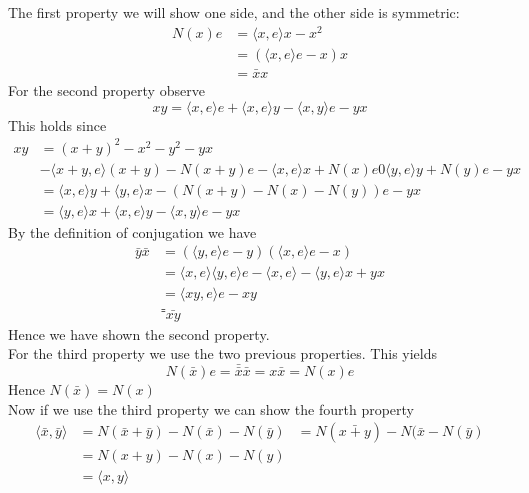 \documentclass[../Thesis.tex]{subfiles}
\begin{document}
\begin{myproof}
The first property we will show one side, and the other side is symmetric:
\begin{align*}
N(x)e &= \langle x,e \rangle x - x^2\\
      &= ( \langle x, e \rangle e - x) x\\
      &= \bar{x}x
\end{align*}
For the second property observe
\begin{equation}
xy = \langle x,e \rangle e + \langle x, e \rangle y - \langle x, y \rangle e - yx
\end{equation}
This holds since
\begin{align*}
xy &= (x + y)^2 - x^2 - y^2 - yx\\
   &- \langle x + y, e \rangle ( x + y) - N(x + y)e - \langle x, e\rangle x + N(x) e 0 \langle y, e \rangle y + N(y)e - yx \\
   &= \langle x,e \rangle y + \langle y, e \rangle x - (N(x + y) - N(x) - N(y))e - yx \\
   &= \langle y, e \rangle x + \langle x, e \rangle y - \langle x,y \rangle e - yx
\end{align*}
By the definition of conjugation we have
\begin{align*}
\bar{y}\bar{x} &= (\langle y,e \rangle e - y)( \langle x, e \rangle e -x) \\
&= \langle x,e \rangle \langle y, e \rangle e - \langle x, e \rangle - \langle y, e \rangle x + yx \\
&= \langle xy, e \rangle e - xy \\
&⁼ \bar{xy}
\end{align*}
Hence we have shown the second property.
\\For the third property we use the two previous properties. This yields
\begin{equation}
N(\bar{x}) e = \bar{\bar{x}}\bar{x} = x \bar{x} = N(x) e
\end{equation}
Hence $N(\bar{x}) = N(x)$
\\Now if we use the third property we can show the fourth property
\begin{align*}
 \langle \bar{x}, \bar{y} \rangle &= N(\bar{x} + \bar{y}) - N(\bar{x}) - N(\bar{y})
 &= N( \bar{x + y}) - N(\bar{x} - N(\bar{y})\\
 &= N(x + y) - N(x) - N(y) \\
 &= \langle x, y \rangle
\end{align*}
\end{myproof}
\end{document}
